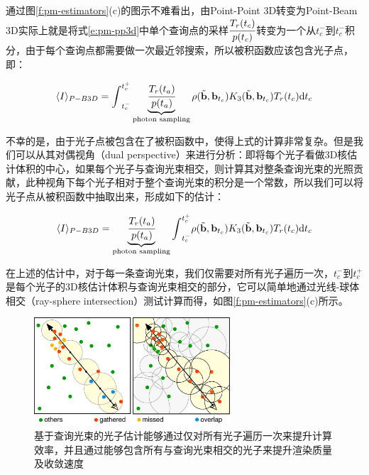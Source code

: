 通过图\ref{f:pm-estimators}(c)的图示不难看出，由Point-Point 3D转变为Point-Beam 3D实际上就是将式\ref{e:pm-pp3d}中单个查询点的采样$ \cfrac{T_r(t_c)}{p(t_c)}$转变为一个从$t^{-}_c$到$t^{-}_c$积分，由于每个查询点都需要做一次最近邻搜索，所以被积函数应该包含光子点，即：

\begin{equation*}
	\langle I\rangle_{P-B3D}={\rm \int}^{t^{+}_{c}}_{t^{-}_{c}}\underbrace{ \cfrac{T_r(t_a)}{p(t_a)}}_{\text{photon sampling}}\rho(\tilde{\mathbf{b}},\mathbf{b}_{t_c})K_3(\tilde{\mathbf{b}},\mathbf{b}_{t_c})T_r(t_c){\rm d}t_c
\end{equation*}

不幸的是，由于光子点被包含在了被积函数中，使得上式的计算非常复杂。但是我们可以从其对偶视角（dual perspective）来进行分析：即将每个光子看做3D核估计体积的中心，如果每个光子与查询光束相交，则计算其对整条查询光束的光照贡献，此种视角下每个光子相对于整个查询光束的积分是一个常数，所以我们可以将光子点从被积函数中抽取出来，形成如下的估计：

\begin{equation}\label{e:pm-pb3d}
	\langle I\rangle_{P-B3D}=\underbrace{ \cfrac{T_r(t_a)}{p(t_a)}}_{\text{photon sampling}}{\rm \int}^{t^{+}_{c}}_{t^{-}_{c}}\rho(\tilde{\mathbf{b}},\mathbf{b}_{t_c})K_3(\tilde{\mathbf{b}},\mathbf{b}_{t_c})T_r(t_c){\rm d}t_c
\end{equation}

在上述的估计中，对于每一条查询光束，我们仅需要对所有光子遍历一次，$t^{-}_c$到$t^{+}_c$是每个光子的3D核估计体积与查询光束相交的部分，它可以简单地通过光线-球体相交（ray-sphere intersection）测试计算而得，如图\ref{f:pm-estimators}(c)所示。

\begin{figure}
	\sidecaption
	\includegraphics[width=0.65\textwidth]{figures/pm/beam-gathering}
	\caption{基于查询光束的光子估计能够通过仅对所有光子遍历一次来提升计算效率，并且通过能够包含所有与查询光束相交的光子来提升渲染质量及收敛速度}
	\label{f:pm-beam-gathering}
\end{figure}

